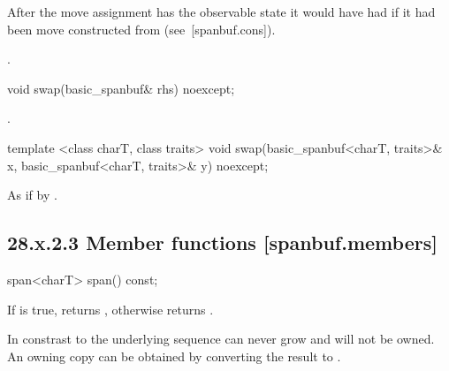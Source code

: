 \documentclass[ebook,11pt,article]{memoir}
\renewcommand{\iref}[1]{[#1]}
\begin{document}
\begin{itemdescr}
\pnum
\effects After the 
move assignment  has the observable state it would
have had if it had been 
move constructed from  (see~\iref{spanbuf.cons}).

\pnum
\returns {}.
\end{itemdescr}

\begin{itemdecl}
void swap(basic_spanbuf& rhs) noexcept;
\end{itemdecl}

\begin{itemdescr}
\pnum
\effects 
{}  .
\end{itemdescr}

\begin{itemdecl}
template <class charT, class traits>
  void swap(basic_spanbuf<charT, traits>& x,
            basic_spanbuf<charT, traits>& y) noexcept;
\end{itemdecl}

\begin{itemdescr}
\pnum
\effects As if by .
\end{itemdescr}


\subsection{28.x.2.3 Member functions [spanbuf.members]}

\begin{itemdecl}
span<charT> span() const;
\end{itemdecl}

\begin{itemdescr}
\pnum
\returns
If  is true,
returns , 
otherwise returns . 
\begin{note}
In constrast to  the underlying sequence can never grow and will not be owned. An owning copy can be obtained by converting the result to .
\end{note}


\end{itemdescr}
\end{document}
